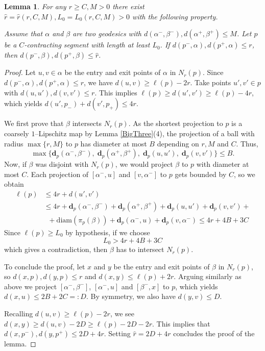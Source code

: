 \documentclass{amsart}
\newtheorem{lem}[thm]{Lemma}
\theoremstyle{definition}
\theoremstyle{remark}
\newcommand{\proj}{\textbf{d}}
\newcommand{\len }{\ell}
\begin{document}
\begin{lem}\label{close barriers in two geodesics}
For any $r\ge C,M>0$ there exist $\hat r=\hat r(r,C,M), L_0=L_0(r,C,M)>0$ with the following property.

Assume that $\alpha$ and $\beta$ are two geodesics with $d(\alpha^-,\beta^-), d(\alpha^+,\beta^+)\le M$. Let $p$ be a $C$-contracting segment with length at least $L_0$. If  $d(p^-,\alpha),d(p^+,\alpha)\le r$, then $d(p^-,\beta),d(p^+,\beta)\le \hat r$.    
\end{lem}
\begin{proof}
Let $u,v\in \alpha$ be the entry and exit points of $\alpha$ in $N_r(p)$.  Since $d(p^-,\alpha),d(p^+,\alpha)\le r$, we have $d(u,v)\ge \len(p)-2r$. Take points $u',v'\in p$ with $d(u,u'),d(v,v')\le r$. This implies $\len(p)\ge d(u',v')\ge \len(p)-4r$, which yields $d(u',p_-)+ d(v',p_+)\le 4r$.

We first prove that $\beta$  intersects $N_r(p)$. 
As the shortest projection to  $p$ is a coarsely $1$--Lipschitz map by Lemma \ref{BigThree}(4), the projection of a ball with radius $\max\{r,M\}$  to $p$  has diameter at most $B$ depending on $r, M$ and $C$. Thus, $$\max\{\proj_{p}(\alpha^-,\beta^-),\;\proj_{p}(\alpha^+,\beta^+),\;\proj_{p}(u,u'),\;\proj_{p}(v,v')\}\le B.$$ Now, if $\beta$ was disjoint with  $N_r(p)$, we would project $\beta$ to $p$ with diameter at most $C$. Each projection of $[\alpha^-,u]$ and $[v,\alpha^-]$ to $p$ gets bounded by $C$, so we obtain 
$$\begin{aligned}
\len(p)&\le 4r+d(u',v')\\
&\le 4r+ \proj_{p}(\alpha^-,\beta^-)+\proj_{p}(\alpha^+,\beta^+)+\proj_{p}(u,u')+\proj_{p}(v,v')+\\
&\;\;+\mathrm{diam}(\pi_{p}(\beta))+\proj_{p}(\alpha^-,u)+\proj_{p}(v,\alpha^-)\le 4r+4B+3C    
\end{aligned}$$ Since $\len(p) \ge L_0$ by hypothesis, if  we choose $$L_0>4r+4B+3C$$ which gives a contradiction, then $\beta$ has to intersect $N_r(p)$. 

To conclude the proof, let $x$ and $y$ be  the entry and exit points of $\beta$ in $N_r(p)$, so $d(x,p),d(y,p)\le r$ and $d(x,y)\le \len(p)+2r$. Arguing similarly as above we project $[\alpha^-,\beta^-]$, $[\alpha^-,u]$ and $[\beta^-,x]$ to $p$, which yields $d(x,u)\le 2B+2C=:D$. By symmetry, we also have $d(y,v)\le D$. 

Recalling  $d(u,v)\ge \len(p)-2r$, we see  $d(x,y)\ge d(u,v)-2D\ge \len(p)-2D-2r$. This implies that $d(x,p^-),d(y,p^+)\le 2D+4r$. Setting $\hat r=2D+4r$ concludes the proof of the lemma.   
\end{proof}
\end{document}
